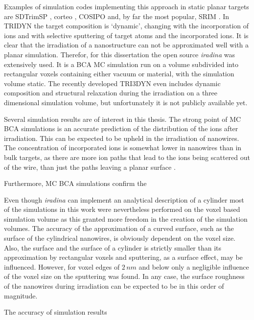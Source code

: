 Examples of simulation codes implementing this approach in static planar targets are SDTrimSP \cite{bizyukov_morphology_2008}, corteo \cite{schiettekatte_fast_2008}, COSIPO \cite{hautala_nuclear_1984} and, by far the most popular, SRIM \cite{ziegler_srim_2012}. In TRIDYN \cite{moller_tridyn_1984} the target composition is `dynamic', changing with the incorporation of ions and with selective sputtering of target atoms and the incorporated ions. It is clear that the irradiation of a nanostructure can not be approximated well with a planar simulation. Therefor, for this dissertation the open source \emph{iradina} \cite{borschel_ion_2011} was extensively used. It is a BCA MC simulation run on a volume subdivided into rectangular voxels containing either vacuum or material, with the simulation volume static. The recently developed TRI3DYN \cite{moller_tri3dyn_2014} even includes dynamic composition and structural relaxation during the irradiation on a three dimensional simulation volume, but unfortunately it is not publicly available yet.

Several simulation results are of interest in this thesis. The strong point of MC BCA simulations is an accurate prediction of the distribution of the ions after irradiation. This can be expected to be upheld in the irradiation of nanowires. The concentration of incorporated ions is somewhat lower in nanowires than in bulk targets, as there are more ion paths that lead to the ions being scattered out of the wire, than just the paths leaving a planar surface \cite{borschel_ion-solid_2012}. 

Furthermore, MC BCA simulations confirm the 

Even though \emph{iradina} can implement an analytical description of a cylinder most of the simulations in this work were nevertheless performed on the voxel based simulation volume as this granted more freedom in the creation of the simulation volumes. The accuracy of the approximation of a curved surface, such as the surface of the cylindrical nanowires, is obviously dependent on the voxel size. Also, the surface and the surface of a cylinder is strictly smaller than its approximation by rectangular voxels and sputtering, as a surface effect, may be influenced. However, for voxel edges of $2\,nm$ and below only a negligible influence of the voxel size on the sputtering was found. In any case, the surface roughness of the nanowires during irradiation can be expected to be in this order of magnitude.

The accuracy of simulation results 



